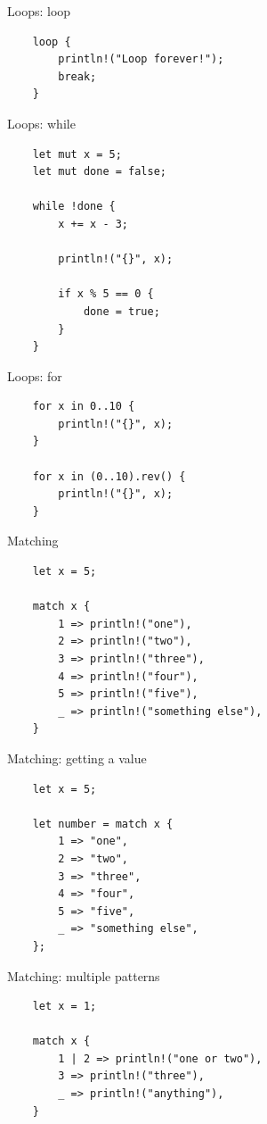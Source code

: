\documentclass[12pt, aspectratio=169]{beamer}
\begin{document}
\begin{frame}[fragile]{Loops: loop}
  \begin{verbatim}
    loop {
        println!("Loop forever!");
        break;
    }
  \end{verbatim}
\end{frame}

\begin{frame}[fragile]{Loops: while}
  \begin{verbatim}
    let mut x = 5;
    let mut done = false;

    while !done {
        x += x - 3;

        println!("{}", x);

        if x % 5 == 0 {
            done = true;
        }
    }
  \end{verbatim}
\end{frame}

\begin{frame}[fragile]{Loops: for}
  \begin{verbatim}
    for x in 0..10 {
        println!("{}", x);
    }

    for x in (0..10).rev() {
        println!("{}", x);
    }
  \end{verbatim}
\end{frame}

\begin{frame}[fragile]{Matching}
  \begin{verbatim}
    let x = 5;

    match x {
        1 => println!("one"),
        2 => println!("two"),
        3 => println!("three"),
        4 => println!("four"),
        5 => println!("five"),
        _ => println!("something else"),
    }
  \end{verbatim}
\end{frame}

\begin{frame}[fragile]{Matching: getting a value}
  \begin{verbatim}
    let x = 5;

    let number = match x {
        1 => "one",
        2 => "two",
        3 => "three",
        4 => "four",
        5 => "five",
        _ => "something else",
    };
  \end{verbatim}
\end{frame}

\begin{frame}[fragile]{Matching: multiple patterns}
  \begin{verbatim}
    let x = 1;

    match x {
        1 | 2 => println!("one or two"),
        3 => println!("three"),
        _ => println!("anything"),
    }
  \end{verbatim}
\end{frame}
\end{document}
